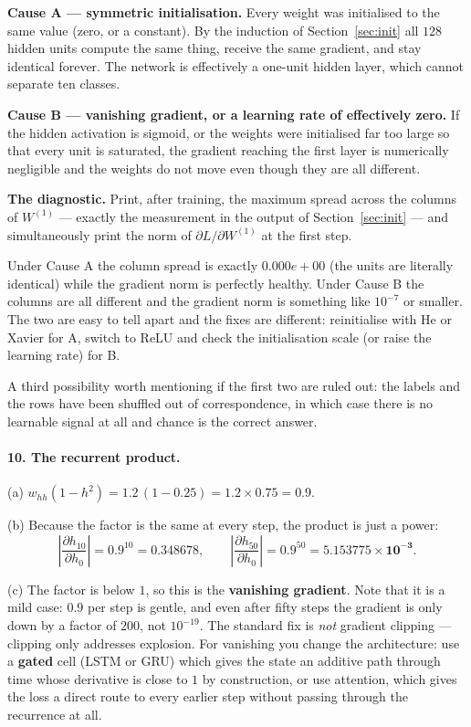 \documentclass[11pt]{article}
\begin{document}
\textbf{Cause A --- symmetric initialisation.} Every weight was initialised to
the same value (zero, or a constant). By the induction of
Section~\ref{sec:init} all $128$ hidden units compute the same thing, receive
the same gradient, and stay identical forever. The network is effectively a
one-unit hidden layer, which cannot separate ten classes.

\textbf{Cause B --- vanishing gradient, or a learning rate of effectively
zero.} If the hidden activation is sigmoid, or the weights were initialised
far too large so that every unit is saturated, the gradient reaching the first
layer is numerically negligible and the weights do not move even though they
are all different.

\textbf{The diagnostic.} Print, after training, the maximum spread across the
columns of $W^{(1)}$ --- exactly the measurement in the output of
Section~\ref{sec:init} --- and simultaneously print the norm of
$\partial L/\partial W^{(1)}$ at the first step.

Under Cause A the column spread is exactly $0.000e{+}00$ (the units are
literally identical) while the gradient norm is perfectly healthy. Under Cause
B the columns are all different and the gradient norm is something like
$10^{-7}$ or smaller. The two are easy to tell apart and the fixes are
different: reinitialise with He or Xavier for A, switch to ReLU and check the
initialisation scale (or raise the learning rate) for B.

A third possibility worth mentioning if the first two are ruled out: the
labels and the rows have been shuffled out of correspondence, in which case
there is no learnable signal at all and chance is the correct answer.

\paragraph{10. The recurrent product.}

(a) $w_{hh}(1 - h^2) = 1.2\,(1 - 0.25) = 1.2 \times 0.75 = \mathbf{0.9}$.

(b) Because the factor is the same at every step, the product is just a power:
\[
  \left|\frac{\partial h_{10}}{\partial h_0}\right| = 0.9^{10}
  = \mathbf{0.348678},
  \qquad
  \left|\frac{\partial h_{50}}{\partial h_0}\right| = 0.9^{50}
  = \mathbf{5.153775\times10^{-3}}.
\]

(c) The factor is below $1$, so this is the \textbf{vanishing gradient}. Note
that it is a mild case: $0.9$ per step is gentle, and even after fifty steps
the gradient is only down by a factor of $200$, not $10^{-19}$. The standard
fix is \emph{not} gradient clipping --- clipping only addresses explosion.
For vanishing you change the architecture: use a \textbf{gated} cell (LSTM or
GRU) which gives the state an additive path through time whose derivative is
close to $1$ by construction, or use attention, which gives the loss a direct
route to every earlier step without passing through the recurrence at all.
\end{document}
